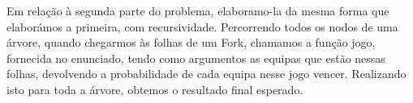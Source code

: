 \documentclass[a4paper]{article}
\newcommand{\Conid}[1]{\mathit{#1}}
\newcommand{\Varid}[1]{\mathit{#1}}
\def\resethooks{%
  \global\let\SaveRestoreHook\empty
  \global\let\ColumnHook\empty}
\let\hspre\empty
\let\hspost\empty
\begin{document}
\par Em relação à segunda parte do problema, elaboramo-la da mesma forma que elaborámos a primeira, com recursividade. Percorrendo todos os nodos de uma árvore,
quando chegarmos às folhas de um Fork, chamamos a função jogo, fornecida no enunciado, tendo como argumentos as equipas que estão nessas folhas, devolvendo
a probabilidade de cada equipa nesse jogo vencer. Realizando isto para toda a árvore, obtemos o resultado final esperado.



\printindex


\def\hiddencode{
\begin{hscode}\SaveRestoreHook
\column{B}{@{}>{\hspre}l<{\hspost}@{}}%
\column{13}{@{}>{\hspre}l<{\hspost}@{}}%
\column{E}{@{}>{\hspre}l<{\hspost}@{}}%
\>[B]{}\mathbf{type}\;1{}\<[13]%
\>[13]{}\mathrel{=}(){}\<[E]%
\\
\>[B]{}\mathbf{type}\;\Varid{a}\times\Varid{b}\mathrel{=}(\Varid{a},\Varid{b}){}\<[E]%
\\
\>[B]{}\Varid{fork}\mathrel{=}\Varid{\Conid{Cp}.split}{}\<[E]%
\\
\>[B]{}\Varid{envia}\mathrel{=}\Varid{unsafePerformIO}{}\<[E]%
\ColumnHook
\end{hscode}\resethooks
}
\end{document}
